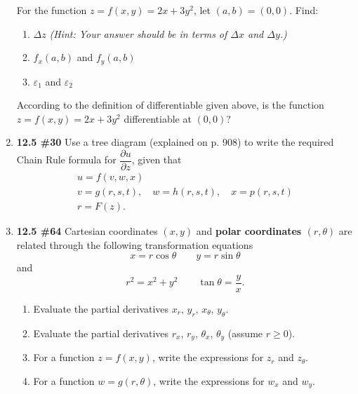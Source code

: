 \documentclass[%
]{article}
\begin{document}
\begin{enumerate}
For the function $z=f(x,y)=2x+3y^2$, let $(a,b)=(0,0)$.  Find:
\begin{enumerate}
	\item $\Delta z$ \textit{(Hint: Your answer should be in terms of $\Delta x$ and $\Delta y$.)}
	\item $f_x(a,b)$ and $f_y(a,b)$
	\item $\varepsilon_1$ and $\varepsilon_2$
\end{enumerate}

According to the definition of differentiable given above, is the function $z=f(x,y)=2x+3y^2$ differentiable at $(0,0)$?


\vspace{1pc}
\item {\bf 12.5 \#30}
Use a tree diagram (explained on p. 908) to write the required Chain Rule formula for $\dfrac{\partial u}{\partial z}$, given that
\[\begin{array}{c}
	u = f(v,w,x) \\
	v = g(r,s,t),\quad w = h(r,s,t),\quad x = p(r,s,t) \\
	r = F(z).
\end{array}\]

\item {\bf 12.5 \#64}
Cartesian coordinates $(x,y)$ and \textbf{polar coordinates $(r,\theta)$} are related through the following transformation equations
\[
x = r\cos{\theta} \qquad y = r\sin{\theta}
\]
and 
\[
r^2 = x^2+y^2 \qquad \tan{\theta} = \frac{y}{x}.
\]
\begin{enumerate}
	\item Evaluate the partial derivatives $x_r,\,y_r,\,x_{\theta},\,y_{\theta}$.
	\item Evaluate the partial derivatives $r_x,\,r_y,\,\theta_x,\,\theta_y$ (assume $r\geq 0$).
	\item For a function $z=f(x,y)$, write the expressions for $z_r$ and $z_{\theta}$.%
	\item For a function $w=g(r,\theta)$, write the expressions for $w_x$ and $w_y$.%
\end{enumerate}


\end{enumerate}
\end{document}
